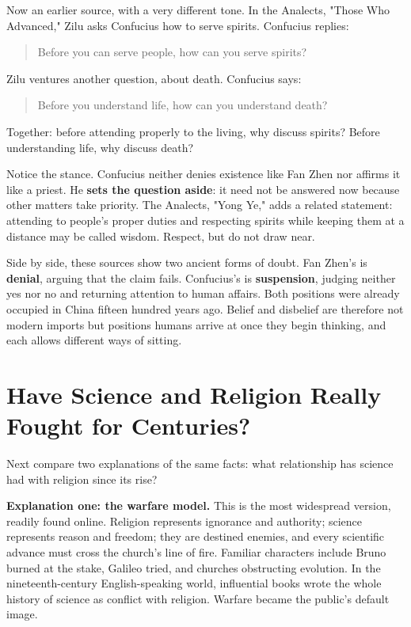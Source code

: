 Now an earlier source, with a very different tone. In the Analects, "Those Who Advanced," Zilu asks Confucius how to serve spirits. Confucius replies:

\begin{quote}
Before you can serve people, how can you serve spirits?
\end{quote}
Zilu ventures another question, about death. Confucius says:

\begin{quote}
Before you understand life, how can you understand death?
\end{quote}
Together: before attending properly to the living, why discuss spirits? Before understanding life, why discuss death?

Notice the stance. Confucius neither denies existence like Fan Zhen nor affirms it like a priest. He \textbf{sets the question aside}: it need not be answered now because other matters take priority. The Analects, "Yong Ye," adds a related statement: attending to people's proper duties and respecting spirits while keeping them at a distance may be called wisdom. Respect, but do not draw near.

Side by side, these sources show two ancient forms of doubt. Fan Zhen's is \textbf{denial}, arguing that the claim fails. Confucius's is \textbf{suspension}, judging neither yes nor no and returning attention to human affairs. Both positions were already occupied in China fifteen hundred years ago. Belief and disbelief are therefore not modern imports but positions humans arrive at once they begin thinking, and each allows different ways of sitting.

\section[Science and Religion: Always at War?]{Have Science and Religion Really Fought for Centuries?}
Next compare two explanations of the same facts: what relationship has science had with religion since its rise?

\textbf{Explanation one: the warfare model.} This is the most widespread version, readily found online. Religion represents ignorance and authority; science represents reason and freedom; they are destined enemies, and every scientific advance must cross the church's line of fire. Familiar characters include Bruno burned at the stake, Galileo tried, and churches obstructing evolution. In the nineteenth-century English-speaking world, influential books wrote the whole history of science as conflict with religion. Warfare became the public's default image.

